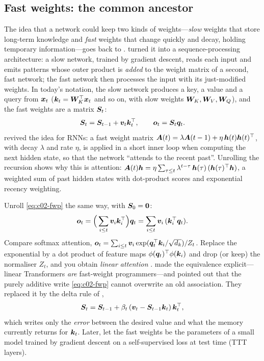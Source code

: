 \subsection{Fast weights: the common ancestor}\label{sec:c02-fastweights}

The idea that a network could keep two kinds of weights---\emph{slow} weights that store
long-term knowledge and \emph{fast} weights that change quickly and decay, holding temporary
information---goes back to \citet{c02-hinton1987fastweights}. \citet{schmidhuber1992fastweights}
turned it into a sequence-processing architecture: a slow network, trained by gradient descent,
reads each input and emits patterns whose outer product is \emph{added} to the weight matrix of a
second, fast network; the fast network then processes the input with its just-modified weights.
In today's notation, the slow network produces a key, a value and a query from $\bm{x}_t$
($\bm{k}_t = \bm{W}_K^{\top}\bm{x}_t$ and so on, with slow weights $\bm{W}_K, \bm{W}_V, \bm{W}_Q$), and the fast weights
are a matrix $\bm{S}_t$:
\begin{equation}\label{eq:c02-fwp}
  \bm{S}_t = \bm{S}_{t-1} + \bm{v}_t\bm{k}_t^{\top}, \qquad \bm{o}_t = \bm{S}_t\bm{q}_t.
\end{equation}
\citet{ba2016fastweights} revived the idea for RNNs: a fast weight matrix
$\bm{A}(t) = \lambda\bm{A}(t-1) + \eta\,\bm{h}(t)\bm{h}(t)^{\top}$, with decay $\lambda$ and rate $\eta$, is applied
in a short inner loop when computing the next hidden state, so that the network ``attends to the
recent past''. Unrolling the recursion shows why this is attention:
$\bm{A}(t)\bm{h} = \eta\sum_{\tau \le t}\lambda^{t-\tau}\,\bm{h}(\tau)\,(\bm{h}(\tau)^{\top}\bm{h})$, a weighted sum of
past hidden states with dot-product scores and exponential recency weighting.

Unroll \eqref{eq:c02-fwp} the same way, with $\bm{S}_0 = \mathbf{0}$:
\begin{equation}\label{eq:c02-fwp-unrolled}
  \bm{o}_t = \Big(\sum_{i \le t}\bm{v}_i\bm{k}_i^{\top}\Big)\bm{q}_t = \sum_{i\le t}\bm{v}_i\,(\bm{k}_i^{\top}\bm{q}_t).
\end{equation}
Compare softmax attention, $\bm{o}_t = \sum_{i\le t}\bm{v}_i\exp(\bm{q}_t^{\top}\bm{k}_i/\sqrt{d_k})/Z_t$. Replace
the exponential by a dot product of feature maps $\phi(\bm{q}_t)^{\top}\phi(\bm{k}_i)$ and drop (or keep) the
normaliser $Z_t$, and you obtain \emph{linear attention} \citep{katharopoulos2020transformers}.
\citet{c02-schlag2021linear} made the equivalence explicit---linear Transformers \emph{are}
fast-weight programmers---and pointed out that the purely additive write
\eqref{eq:c02-fwp} cannot overwrite an old association. They replaced it by the delta rule of
\citet{c02-widrow1960adaptive},
\begin{equation}\label{eq:c02-delta-intro}
  \bm{S}_t = \bm{S}_{t-1} + \beta_t\,(\bm{v}_t - \bm{S}_{t-1}\bm{k}_t)\,\bm{k}_t^{\top},
\end{equation}
which writes only the \emph{error} between the desired value and what the memory currently
returns for $\bm{k}_t$. Later, \citet{c02-sun2024ttt} let the fast weights be the parameters of a
small model trained by gradient descent on a self-supervised loss at test time (TTT layers).

